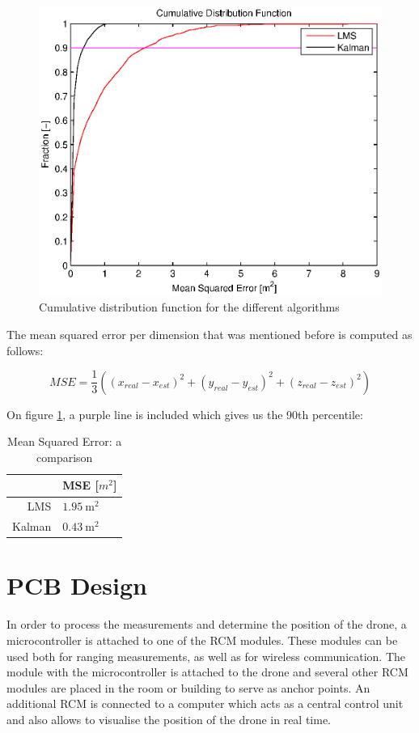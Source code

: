 \documentclass[a4paper]{article}        %
\begin{document}
			\begin{figure}[H]
				\centering
				\includegraphics[width=\textwidth]{images/cdf_algorithms.eps}
				\caption{Cumulative distribution function for the different algorithms}
				\label{fig:cdf}
			\end{figure}

The mean squared error per dimension that was mentioned before is computed as follows:

\begin{equation}
MSE = \dfrac{1}{3}((x_{real}-x_{est})^2+(y_{real}-y_{est})^2+(z_{real}-z_{est})^2)
\end{equation}

On figure \ref{fig:cdf}, a purple line is included which gives us the 90th percentile:

\begin{table}[H]
\begin{center}
\begin{tabular}{ | r | l | }
    \hline
     & MSE [$m^2$] \\ \hline
    LMS & $\SI{1.95}{\square\meter}$ \\ \hline
    Kalman & $\SI{0.43}{\square\meter}$ \\
    \hline
\end{tabular}
\end{center}
\caption{Mean Squared Error: a comparison}
\label{table:MSE}
\end{table}

\section{PCB Design}
  In order to process the measurements and determine the position of the drone, a microcontroller is attached to one of the RCM modules.
  These modules can be used both for ranging measurements, as well as for wireless communication. The module with the microcontroller is attached to the drone and several other RCM modules are placed in the room or building to serve as anchor points. An additional RCM is connected to a computer which acts as a central control unit and also allows to visualise the position of the drone in real time.
\end{document}
